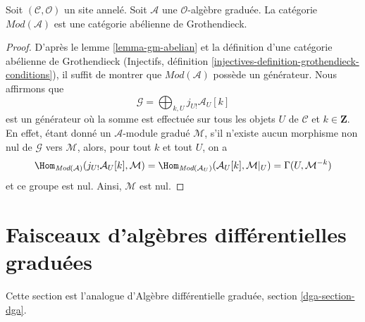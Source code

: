 \begin{lemma}
\label{lemma-gm-grothendieck-abelian}
Soit $(\mathcal{C}, \mathcal{O})$ un site annelé. Soit
$\mathcal{A}$ une $\mathcal{O}$-algèbre graduée. La
catégorie $\textit{Mod}(\mathcal{A})$ est une catégorie abélienne de Grothendieck.
\end{lemma}

\begin{proof}
D'après le lemme \ref{lemma-gm-abelian} et la définition d'une catégorie
abélienne de Grothendieck
(Injectifs, définition \ref{injectives-definition-grothendieck-conditions}),
il suffit de
montrer que $\textit{Mod}(\mathcal{A})$ possède un générateur. Nous affirmons
que $$
\mathcal{G} = \bigoplus\nolimits_{k, U} j_{U!}\mathcal{A}_U[k]
$$
est un générateur où la somme est effectuée sur tous les objets $U$ de $\mathcal{C}$
et $k \in \mathbf{Z}$. En effet, étant donné un $\mathcal{A}$-module
gradué $\mathcal{M}$, s'il n'existe aucun morphisme non nul de $\mathcal{G}$ vers $\mathcal{M}$,
alors, pour tout $k$ et tout $U$,
on a $$
\Hom_{\textit{Mod}(\mathcal{A})}(j_{U!}\mathcal{A}_U[k], \mathcal{M})
= \Hom_{\textit{Mod}(\mathcal{A}_U)}(\mathcal{A}_U[k], \mathcal{M}|_U) =
\Gamma(U, \mathcal{M}^{-k})
$$ et
ce groupe est nul. Ainsi, $\mathcal{M}$ est nul.
\end{proof}









\section{Faisceaux d'algèbres différentielles graduées}
\label{section-dga}

\noindent
Cette section est l'analogue
d'Algèbre différentielle graduée, section \ref{dga-section-dga}.

